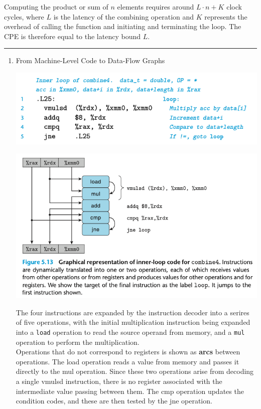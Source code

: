 \documentclass[11pt]{article}
\begin{document}
Computing the product or sum of \(n\) elements requires around \(L\cdot n + K\) clock cycles, where \(L\) is the latency of the combining operation and \(K\) represents the overhead of calling the function and initiating and terminating the loop. The CPE is therefore equal to the latency bound \(L\).\\

\noindent\rule{\textwidth}{0.5pt}

\begin{enumerate}
\item From Machine-Level Code to Data-Flow Graphs
\label{sec:orga19949c}

\begin{center}
\includegraphics[width=.9\linewidth]{pics/combine4-assembly.png}
\end{center}

\begin{center}
\includegraphics[width=.9\linewidth]{pics/figure5.13-graphical-representation-of-inner-loop-code-for-combine4.png}
\end{center}

The four instructions are expanded by the instruction decoder into a serires of five operations, with the initial multiplication instruction being expanded into a \texttt{load} operation to read the source operand from memory, and a \texttt{mul} operation to perform the multiplication.\\

Operations that do not correspond to registers is shown as \textbf{arcs} between operations. The load operation reads a value from memory and passes it directly to the mul operation. Since these two operations arise from decoding a single vmulsd instruction, there is no register associated with the intermediate value passing between them. The cmp operation updates the condition codes, and these are then tested by the jne operation.\\



\end{enumerate}
\end{document}
